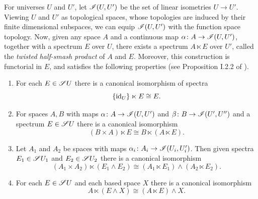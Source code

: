 \documentclass[openany, amssymb, psamsfonts]{amsart}
\theoremstyle{definition}
\numberwithin{equation}{section}
\begin{document}
For universes $U$ and $U'$, let $\mathscr{I}(U, U')$ be the set of linear isometries $U \to U'$. Viewing $U$ and $U'$ as topological spaces, whose topologies are induced by their finite dimensional subspaces, we can equip $\mathscr{I}(U, U')$ with the function space topology. Now, given any space $A$ and a continuous map $\alpha \colon A \to \mathscr{I}(U, U')$, together with a spectrum $E$ over $U$, there exists a spectrum $A \ltimes E$ over $U'$, called the \emph{twisted half-smash product} of $A$ and $E$. Moreover, this construction is functorial in $E$, and satisfies the following properties (see Proposition I.2.2 of \cite{EKMM}).
\begin{enumerate}
    \item \label{item:ltimes_id} For each $E \in \mathscr{S} U$ there is a canonical isomorphism of spectra
    \begin{equation*}
        \{\mathrm{id}_U\} \ltimes E \cong E.
    \end{equation*}
    \item \label{item:ltimes_assoc} For spaces $A, B$ with maps $\alpha \colon A \to \mathscr{I}(U, U')$ and $\beta \colon B \to \mathscr{I}(U', U'')$ and a spectrum $E \in \mathscr{S} U$ there is a canonical isomorphism
    \begin{equation*}
        (B \times A) \ltimes E \cong B \ltimes (A \ltimes E).
    \end{equation*}
    \item \label{item:ltimes_distribute} Let $A_1$ and $A_2$ be spaces with maps $\alpha_i \colon A_i \to \mathscr{I}(U_i, U_i')$. Then given spectra $E_1 \in \mathscr{S} U_1$ and $E_2 \in \mathscr{S} U_2$ there is a canonical isomorphism
    \begin{equation*}
        (A_1 \times A_2) \ltimes (E_1 \wedge E_2) \cong (A_1 \ltimes E_1) \wedge (A_2 \ltimes E_2).
    \end{equation*}
    \item \label{item:ltimes_homo} For each $E \in \mathscr{S} U$ and each based space $X$ there is a canonical isomorphism
    \begin{equation*}
        A \ltimes (E \wedge X) \cong (A \ltimes E) \wedge X.
    \end{equation*}
\end{enumerate}
\end{document}
